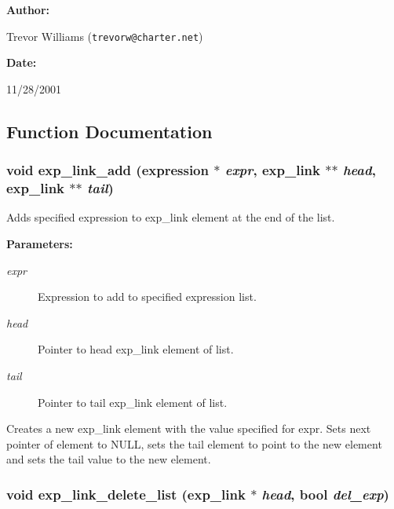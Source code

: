 \begin{Desc}
\item[{\bf Author: }]\par
Trevor Williams ({\tt trevorw@charter.net}) \end{Desc}
\begin{Desc}
\item[{\bf Date: }]\par
11/28/2001

\end{Desc}


\subsection{Function Documentation}
\subsubsection{\setlength{\rightskip}{0pt plus 5cm}void exp\_\-link\_\-add ({\bf expression} $\ast$ {\em expr}, {\bf exp\_\-link} $\ast$$\ast$ {\em head}, {\bf exp\_\-link} $\ast$$\ast$ {\em tail})}\label{link_8h_a3}


Adds specified expression to exp\_\-link element at the end of the list.

\begin{Desc}
\item[{\bf Parameters: }]\par
\begin{description}
\item[
{\em expr}]Expression to add to specified expression list. \item[
{\em head}]Pointer to head exp\_\-link element of list. \item[
{\em tail}]Pointer to tail exp\_\-link element of list.

\end{description}
\end{Desc}
Creates a new exp\_\-link element with the value specified for expr. Sets next pointer of element to NULL, sets the tail element to point to the new element and sets the tail value to the new element. 
\subsubsection{\setlength{\rightskip}{0pt plus 5cm}void exp\_\-link\_\-delete\_\-list ({\bf exp\_\-link} $\ast$ {\em head}, {\bf bool} {\em del\_\-exp})}\label{link_8h_a20}


